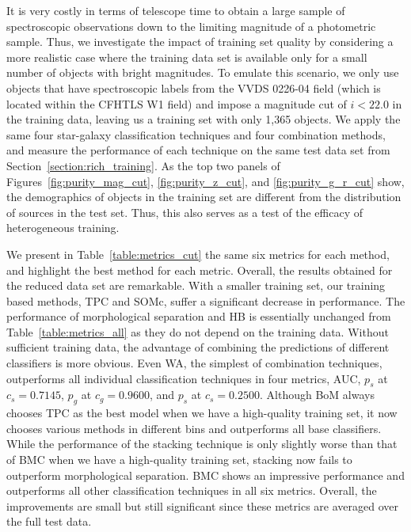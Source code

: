 It is very costly in terms of telescope time to
obtain a large sample of spectroscopic observations
down to the limiting magnitude of a photometric sample.
Thus, we investigate the impact of training set quality
by considering a more realistic case
where the training data set is available
only for a small number of objects with bright magnitudes.
To emulate this scenario,
we only use objects that have spectroscopic labels
from the VVDS 0226-04 field (which is located within the CFHTLS W1 field)
and impose a magnitude cut of $i < 22.0$ in the training data,
leaving us a training set with only 1,365 objects.
We apply the same four star-galaxy classification techniques
and four combination methods,
and measure the performance of each technique on the same test data set
from Section~\ref{section:rich_training}.
As the top two panels of Figures~\ref{fig:purity_mag_cut},
\ref{fig:purity_z_cut}, and \ref{fig:purity_g_r_cut} show,
the demographics of objects in the training set
are different from the distribution of sources in the test set.
Thus, this also serves as a test of the efficacy of heterogeneous training.

We present in Table~\ref{table:metrics_cut}
the same six metrics for each method,
and highlight the best method for each metric.
Overall, the results obtained for the reduced data set are remarkable.
With a smaller training set, our training based methods, TPC and SOMc,
suffer a significant decrease in performance.
The performance of morphological separation and HB
is essentially unchanged from Table~\ref{table:metrics_all}
as they do not depend on the training data.
Without sufficient training data,
the advantage of combining the predictions of different classifiers
is more obvious.
Even WA, the simplest of combination techniques, outperforms
all individual classification techniques in four metrics,
AUC, $p_s$ at $c_s=0.7145$, $p_g$ at $c_g=0.9600$, and $p_s$ at $c_s=0.2500$.
Although BoM always chooses TPC as the best model
when we have a high-quality training set,
it now chooses various methods in different bins
and outperforms all base classifiers.
While the performance of the stacking technique is only slightly worse
than that of BMC when we have a high-quality training set,
stacking now fails to outperform morphological separation.
BMC shows an impressive performance and 
outperforms all other classification techniques in all six metrics.
Overall, the improvements are small but still significant
since these metrics are averaged over the full test data.


